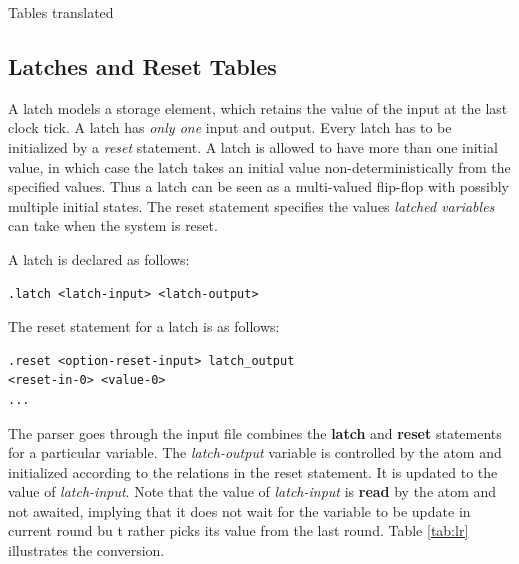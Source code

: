 \begin{table}

\hspace{3em}

\caption{Tables translated}
\label{table:tabl}
\end{table}
%
%
%


\subsection{Latches and Reset Tables}
A latch models a storage element, which retains the value of the
input at the last clock tick. A latch has \emph{only one} input
and output. Every latch has to be initialized by a  \emph{reset}
statement. A latch is allowed to have more than one initial value,
in which case the latch takes an initial value
non-deterministically from the specified values. Thus a latch can
be seen as a multi-valued flip-flop with possibly multiple initial
states. The reset statement specifies the values \emph{latched
variables} can take when the system is reset.

A latch is declared as follows:
\begin{verbatim}
.latch <latch-input> <latch-output>
\end{verbatim}

The reset statement for a latch is as follows:
\begin{verbatim}
.reset <option-reset-input> latch_output
<reset-in-0> <value-0>
...
\end{verbatim}

The {\mvrm } parser goes through the input file combines the {\bf
latch} and {\bf reset }statements for a particular variable. The
\emph{latch-output} variable is controlled by the atom and
initialized according to the relations in the reset statement. It
is updated to the value of \emph{latch-input}. Note that the value
of \emph{latch-input} is \textbf{read} by the atom and not
awaited, implying that it does not wait for the variable to be
update in current round bu t rather picks its value from the last
round. Table \ref{tab:lr} illustrates the conversion.

